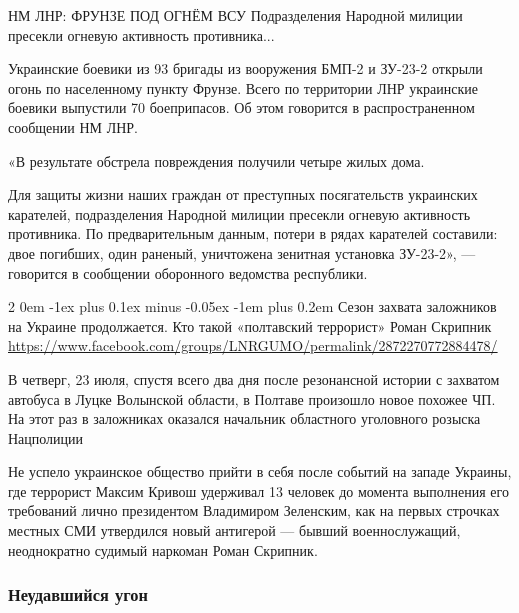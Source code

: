 \documentclass[a4paper,11pt]{extreport}
\makeatletter
\renewcommand\subsection{%
  \clearpage
    \@startsection{subsection}%
    {2}%
    {0em}%
    {-1ex plus 0.1ex minus -0.05ex}%
    {-1em plus 0.2em}%
    {\scshape\bfseries\Large}%
}
\makeatother
\begin{document}

НМ ЛНР: ФРУНЗЕ ПОД ОГНЁМ ВСУ
Подразделения Народной милиции пресекли огневую активность противника...

Украинские боевики из 93 бригады из вооружения БМП-2 и ЗУ-23-2 открыли огонь по
населенному пункту Фрунзе. Всего по территории ЛНР украинские боевики выпустили
70 боеприпасов.  Об этом говорится в распространенном сообщении НМ ЛНР.

«В результате обстрела повреждения получили четыре жилых дома.

Для защиты жизни наших граждан от преступных посягательств украинских
карателей, подразделения Народной милиции пресекли огневую активность
противника. По предварительным данным, потери в рядах карателей составили: двое
погибших, один раненый, уничтожена зенитная установка ЗУ-23-2», --- говорится в
сообщении оборонного ведомства республики.
  
 
 
\subsection{Сезон захвата заложников на Украине продолжается. Кто такой
«полтавский террорист» Роман Скрипник}
\url{https://www.facebook.com/groups/LNRGUMO/permalink/2872270772884478/}


В четверг, 23 июля, спустя всего два дня после резонансной истории с захватом
автобуса в Луцке Волынской области, в Полтаве произошло новое похожее ЧП. На
этот раз в заложниках оказался начальник областного уголовного розыска
Нацполиции

Не успело украинское общество прийти в себя после событий на западе Украины,
где террорист Максим Кривош удерживал 13 человек до момента выполнения его
требований лично президентом Владимиром Зеленским, как на первых строчках
местных СМИ утвердился новый антигерой --- бывший военнослужащий, неоднократно
судимый наркоман Роман Скрипник.  

\subsubsection{Неудавшийся угон}
\label{sec:24_07_2020.fb.lnr.4}
\end{document}
